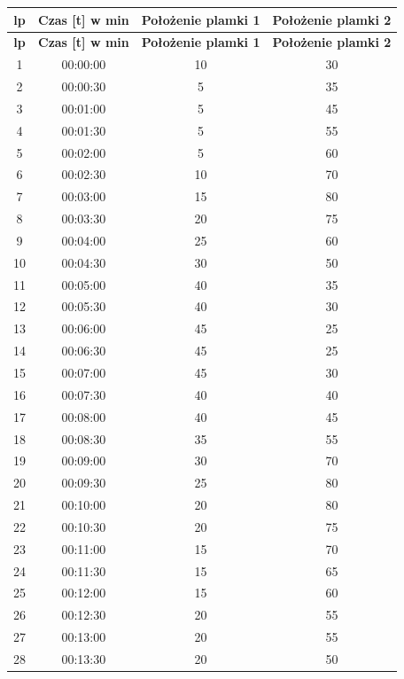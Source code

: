 \documentclass[a4paper,12pt]{article}
\begin{document}
\begin{longtable}{|c|c|c|c|}
    \hline
    \textbf{lp} & \textbf{Czas [t] w min} & \textbf{Położenie plamki 1} & \textbf{Położenie plamki 2} \\
    \hline
    \endfirsthead
    \hline
    \textbf{lp} & \textbf{Czas [t] w min} & \textbf{Położenie plamki 1} & \textbf{Położenie plamki 2} \\
    \hline
    \endhead
    1 & 00:00:00 & 10 & 30 \\ \hline
    2 & 00:00:30 & 5  & 35 \\ \hline
    3 & 00:01:00 & 5  & 45 \\ \hline
    4 & 00:01:30 & 5  & 55 \\ \hline
    5 & 00:02:00 & 5  & 60 \\ \hline
    6 & 00:02:30 & 10 & 70 \\ \hline
    7 & 00:03:00 & 15 & 80 \\ \hline
    8 & 00:03:30 & 20 & 75 \\ \hline
    9 & 00:04:00 & 25 & 60 \\ \hline
    10 & 00:04:30 & 30 & 50 \\ \hline
    11 & 00:05:00 & 40 & 35 \\ \hline
    12 & 00:05:30 & 40 & 30 \\ \hline
    13 & 00:06:00 & 45 & 25 \\ \hline
    14 & 00:06:30 & 45 & 25 \\ \hline
    15 & 00:07:00 & 45 & 30 \\ \hline
    16 & 00:07:30 & 40 & 40 \\ \hline
    17 & 00:08:00 & 40 & 45 \\ \hline
    18 & 00:08:30 & 35 & 55 \\ \hline
    19 & 00:09:00 & 30 & 70 \\ \hline
    20 & 00:09:30 & 25 & 80 \\ \hline
    21 & 00:10:00 & 20 & 80 \\ \hline
    22 & 00:10:30 & 20 & 75 \\ \hline
    23 & 00:11:00 & 15 & 70 \\ \hline
    24 & 00:11:30 & 15 & 65 \\ \hline
    25 & 00:12:00 & 15 & 60 \\ \hline
    26 & 00:12:30 & 20 & 55 \\ \hline
    27 & 00:13:00 & 20 & 55 \\ \hline
    28 & 00:13:30 & 20 & 50 \\ \hline

\end{longtable}
\end{document}

